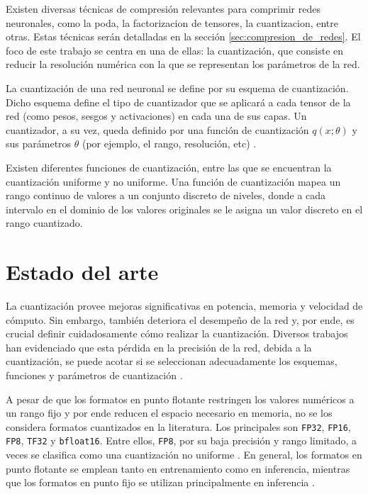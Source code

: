 Existen diversas técnicas de compresión relevantes para comprimir redes neuronales, como la poda, la factorizacion de tensores, la cuantizacion, entre otras.
Estas técnicas serán detalladas en la sección \ref{sec:compresion_de_redes}. El foco de este trabajo se centra en una de ellas:
la cuantización, que consiste en reducir la resolución numérica con la que se representan los parámetros de la red.

La cuantización de una red neuronal se define por su esquema de cuantización. Dicho esquema define el tipo de cuantizador que se aplicará a cada tensor de la red (como pesos, sesgos y activaciones) en cada una de sus capas. Un cuantizador, a su vez, queda definido por una función de cuantización $q(x; \theta)$ y sus parámetros $\theta$ (por ejemplo, el rango, resolución, etc) \cite{8253600}.

Existen diferentes funciones de cuantización, entre las que se encuentran la cuantización uniforme y no uniforme. Una función de cuantización mapea un rango continuo de valores a un conjunto discreto de niveles, donde a cada intervalo en el dominio de los valores originales se le asigna un valor discreto en el rango cuantizado.

\section{Estado del arte}
\label{sec:estado_arte}
La cuantización provee mejoras significativas en potencia, memoria y velocidad de cómputo. Sin embargo, también deteriora el desempeño de la red y, por ende, es crucial definir cuidadosamente cómo realizar la cuantización. Diversos trabajos han evidenciado que esta pérdida en la precisión de la red, debida a la cuantización, se puede acotar si se seleccionan adecuadamente los esquemas, funciones y parámetros de cuantización \cite{jin2020rethinking} \cite{chen2019layerwise}.

A pesar de que los formatos en punto flotante restringen los valores numéricos a un rango fijo y por ende reducen el espacio necesario en memoria, no se los considera formatos cuantizados en la literatura. Los principales son \texttt{FP32}, \texttt{FP16}, \texttt{FP8}, \texttt{TF32} y \texttt{bfloat16}. Entre ellos, \texttt{FP8}, por su baja precisión y rango limitado, a veces se clasifica como una cuantización no uniforme \cite{NVIDIA2022}. En general, los formatos en punto flotante se emplean tanto en entrenamiento como en inferencia, mientras que los formatos en punto fijo se utilizan principalmente en inferencia \cite{NVIDIA2022}.

